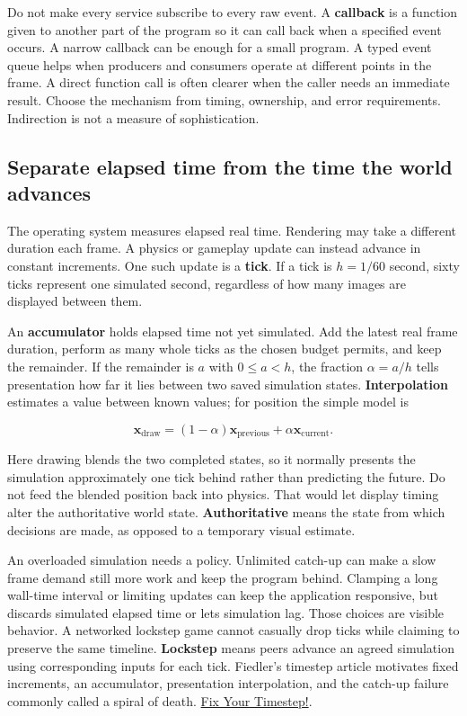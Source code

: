 Do not make every service subscribe to every raw event. A \textbf{callback} is a function given to another part of the program so it can call back when a specified event occurs. A narrow callback can be enough for a small program. A typed event queue helps when producers and consumers operate at different points in the frame. A direct function call is often clearer when the caller needs an immediate result. Choose the mechanism from timing, ownership, and error requirements. Indirection is not a measure of sophistication.

\subsection{Separate elapsed time from the time the world advances}\label{05-engine-i-ch013-separate-elapsed-time-from-the-time-the-world-advances}

\hypertarget{05-engine-i-ch013-separate-elapsed-time-from-the-time-the-world-advances}{}

The operating system measures elapsed real time. Rendering may take a different duration each frame. A physics or gameplay update can instead advance in constant increments. One such update is a \textbf{tick}. If a tick is \(h=1/60\) second, sixty ticks represent one simulated second, regardless of how many images are displayed between them.

An \textbf{accumulator} holds elapsed time not yet simulated. Add the latest real frame duration, perform as many whole ticks as the chosen budget permits, and keep the remainder. If the remainder is \(a\) with \(0\le a<h\), the fraction \(\alpha=a/h\) tells presentation how far it lies between two saved simulation states. \textbf{Interpolation} estimates a value between known values; for position the simple model is

\[
\mathbf{x}_{\mathrm{draw}}=(1-\alpha)\mathbf{x}_{\mathrm{previous}}+\alpha\mathbf{x}_{\mathrm{current}}.
\]

Here drawing blends the two completed states, so it normally presents the simulation approximately one tick behind rather than predicting the future. Do not feed the blended position back into physics. That would let display timing alter the authoritative world state. \textbf{Authoritative} means the state from which decisions are made, as opposed to a temporary visual estimate.

An overloaded simulation needs a policy. Unlimited catch-up can make a slow frame demand still more work and keep the program behind. Clamping a long wall-time interval or limiting updates can keep the application responsive, but discards simulated elapsed time or lets simulation lag. Those choices are visible behavior. A networked lockstep game cannot casually drop ticks while claiming to preserve the same timeline. \textbf{Lockstep} means peers advance an agreed simulation using corresponding inputs for each tick. Fiedler's timestep article motivates fixed increments, an accumulator, presentation interpolation, and the catch-up failure commonly called a spiral of death. \href{https://gafferongames.com/post/fix_your_timestep/}{Fix Your Timestep!}.


